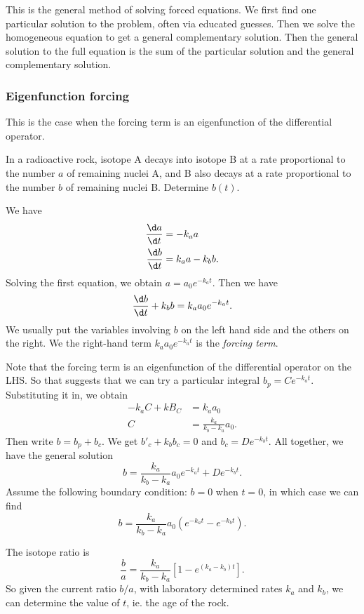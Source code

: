 \documentclass[a4paper]{article}
\begin{document}
This is the general method of solving forced equations. We first find one particular solution to the problem, often via educated guesses. Then we solve the homogeneous equation to get a general complementary solution. Then the general solution to the full equation is the sum of the particular solution and the general complementary solution.

\subsubsection{Eigenfunction forcing}
This is the case when the forcing term is an eigenfunction of the differential operator.
\begin{eg}
  In a radioactive rock, isotope A decays into isotope B at a rate proportional to the number $a$ of remaining nuclei A, and B also decays at a rate proportional to the number $b$ of remaining nuclei B. Determine $b(t)$.

  We have
  \begin{align*}
    \frac{\d a}{\d t} &= -k_a a\\
    \frac{\d b}{\d t} &= k_a a - k_b b.
  \end{align*}
  Solving the first equation, we obtain $a = a_0e^{-k_at}$. Then we have
  \[
    \frac{\d b}{\d t} + k_b b = k_aa_0e^{-k_at}.
  \]
  We usually put the variables involving $b$ on the left hand side and the others on the right. We the right-hand term $k_aa_0e^{-k_at}$ is the \emph{forcing term}.

  Note that the forcing term is an eigenfunction of the differential operator on the LHS. So that suggests that we can try a particular integral $b_p = Ce^{-k_at}$. Substituting it in, we obtain
  \begin{align*}
    -k_aC + kB_C &= k_a a_0\\
    C &= \frac{k_a}{k_b - k_a}a_0.
  \end{align*}
  Then write $b = b_p + b_c$. We get $b'_c + k_bb_c = 0$ and $b_c = De^{-k_bt}$. All together, we have the general solution
  \[
    b = \frac{k_a}{k_b - k_a}a_0 e^{-k_at} + De^{-k_bt}.
  \]
  Assume the following boundary condition: $b = 0$ when $t = 0$, in which case we can find
  \[
    b = \frac{k_a}{k_b - k_a}a_0\left(e^{-k_at} - e^{-k_bt}\right).
  \]
  \begin{center}
  \end{center}
  The isotope ratio is
  \[
    \frac{b}{a} = \frac{k_a}{k_b - k_a}\left[1 - e^{(k_a - k_b)t}\right].
  \]
  So given the current ratio $b/a$, with laboratory determined rates $k_a$ and $k_b$, we can determine the value of $t$, ie. the age of the rock.
\end{eg}
\end{document}
